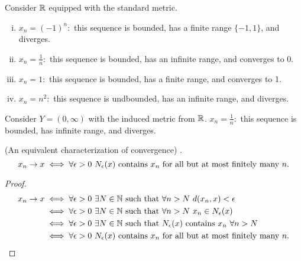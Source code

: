     \begin{example}
        Consider $\mathbb{R}$ equipped with the standard metric.
        \begin{enumerate}[(i)]
            \item $x_n = (-1)^n:$ this sequence is bounded, has a finite range $\{-1, 1\}$, and diverges.
            \item $x_n = \frac{1}{n}:$ this sequence is bounded, has an infinite range, and converges to $0$.
            \item $x_n = 1:$ this sequence is bounded, has a finite range, and converges to 1.
            \item $x_n=n^2:$ this sequence is undbounded, has an infinite range, and diverges.
        \end{enumerate}
    \end{example}

    \begin{example}
        Consider $Y= (0, \infty)$ with the induced metric from $\mathbb{R}$.
        $x_n = \frac{1}{n}:$ this sequence is bounded, has infinite range, and diverges.
    \end{example}

    \begin{theorem}(An equivalent characterization of convergence)
        \routineMS.
        $$x_n \to x \iff \forall \epsilon > 0 ~N_{\epsilon}(x) \text{ contains $x_n$ for all but at most finitely many $n$.}$$
    \end{theorem}
    \begin{proof}
        \begin{align*}
            x_n \to x &\iff \forall \epsilon > 0 ~\exists N \in \mathbb{N} \text{ such that } \forall n > N ~d(x_n, x) < \epsilon \\
            &\iff \forall \epsilon > 0 ~\exists N \in \mathbb{N} \text{ such that } \forall n > N ~x_n \in N_{\epsilon}(x) \\
            &\iff \forall \epsilon > 0 ~\exists N \in \mathbb{N} \text{ such that } N_{\epsilon}(x) \text{ contains } x_n ~\forall n > N \\
            &\iff \forall \epsilon > 0 ~N_{\epsilon}(x) \text{ contains $x_n$ for all but at most finitely many $n$}.
        \end{align*}
    \end{proof}

